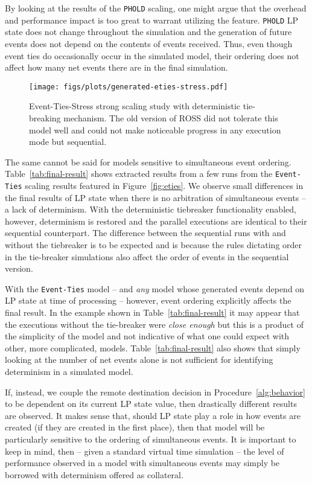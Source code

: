 \documentclass[nonacm,sigconf]{acmart}
\begin{document}
By looking at the results of the \texttt{PHOLD} scaling, one might argue that the overhead and performance impact is too great to warrant utilizing the feature. \texttt{PHOLD} LP state does not change throughout the simulation and the generation of future events does not depend on the contents of events received. Thus, even though event ties do occasionally occur in the simulated model, their ordering does not affect how many net events there are in the final simulation.


\begin{figure}[t]
  \centering
  \texttt{[image: figs/plots/generated-eties-stress.pdf]}
  \caption{Event-Ties-Stress strong scaling study with deterministic tie-breaking mechanism. The old version of ROSS did not tolerate this model well and could not make noticeable progress in any execution mode but sequential.} \label{fig:eties-stress}
\end{figure}



The same cannot be said for models sensitive to simultaneous event ordering. Table~\ref{tab:final-result} shows extracted results from a few runs from the \texttt{Event-Ties} scaling results featured in Figure~\ref{fig:eties}. We observe small differences in the final results of LP state when there is no arbitration of simultaneous events -- a lack of determinism. With the deterministic tiebreaker functionality enabled, however, determinism is restored and the parallel executions are identical to their sequential counterpart. The difference between the sequential runs with and without the tiebreaker is to be expected and is because the rules dictating order in the tie-breaker simulations also affect the order of events in the sequential version.

With the \texttt{Event-Ties} model -- and \emph{any} model whose generated events depend on LP state at time of processing -- however, event ordering explicitly affects the final result. In the example shown in Table~\ref{tab:final-result} it may appear that the executions without the tie-breaker were \emph{close enough} but this is a product of the simplicity of the model and not indicative of what one could expect with other, more complicated, models. Table~\ref{tab:final-result} also shows that simply looking at the number of net events alone is not sufficient for identifying determinism in a simulated model.

If, instead, we couple the remote destination decision in Procedure~\ref{alg:behavior} to be dependent on its current LP state value, then drastically different results are observed. It makes sense that, should LP state play a role in how events are created (if they are created in the first place), then that model will be particularly sensitive to the ordering of simultaneous events. It is important to keep in mind, then -- given a standard virtual time simulation -- the level of performance observed in a model with simultaneous events may simply be borrowed with determinism offered as collateral. 
\end{document}
